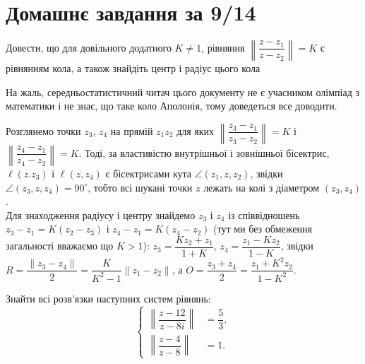 \setcounter{section}{2}

\section{Домашнє завдання за 9/14}

\begin{problem}[1.24, Евграфов]
    Довести, що для довільного додатного $K\ne1$, рівняння $\left\|\dfrac{z-z_1}{z-z_2}\right\|=K$ є рівнянням кола, а також знайдіть центр і радіус цього кола 
\end{problem}

\begin{side_comment}
    На жаль, середньостатистичний читач цього документу не є учасником олімпіад з математики і не знає, що таке коло Аполонія, тому доведеться все доводити.    
\end{side_comment}

\begin{solution}
    Розглянемо точки $z_3$, $z_4$ на прямій $z_1z_2$ для яких $\left\|\dfrac{z_3-z_1}{z_3-z_2}\right\|=K$ і $\left\|\dfrac{z_4-z_1}{z_4-z_2}\right\|=K$. Тоді, за властивістю внутрішньої і зовнішньої бісектрис, $\ell(z.z_3)$ і $\ell(z,z_4)$ є бісектрисами кута $\angle(z_1,z,z_2)$, звідки $\angle(z_3, z, z_4) = 90^\circ$, тобто всі шукані точки $z$ лежать на колі з діаметром $(z_3,z_4)$.\\
    
    Для знаходження радіусу і центру знайдемо $z_3$ і $z_4$ із співвідношень $z_3 - z_1 = K (z_2 - z_3)$ і $z_4 - z_1 = K(z_4 - z_2)$ (тут ми без обмеження загальності вважаємо що $K > 1$): $z_3 = \dfrac{Kz_2 + z_1}{1 + K}$, $z_4 = \dfrac{z_1 - Kz_2}{1 - K}$, звідки $R = \dfrac{\|z_3 - z_4\|}{2} = \dfrac{K}{K^2 - 1}\|z_1 - z_2\|$, а $O = \dfrac{z_3 + z_4}{2} = \dfrac{z_1 + K^2 z_2}{1 - K^2}$.
\end{solution}


\begin{problem}[1.25.1, Евграфов]
    Знайти всі розв'язки наступних систем рівнянь:
        \begin{equation*}
        \left\{
        \begin{aligned}
            \left\| \dfrac{z - 12}{z - 8i} \right\| &= \dfrac53, \\ 
            \left\| \dfrac{z - 4}{z - 8} \right\| &= 1.
        \end{aligned}
        \right.
        \end{equation*} 
\end{problem}

